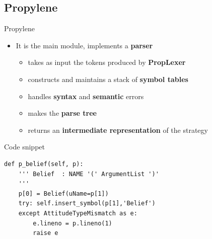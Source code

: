 \subsection{Propylene}
\begin{frame}[fragile]{Propylene}
  \begin{itemize}
  \item It is the main module, implements a {\bf parser}
    \begin{itemize}
    \item takes as input the tokens produced by {\bf PropLexer}
    \item constructs and maintains a stack of {\bf symbol tables}
    \item handles {\bf syntax} and {\bf semantic} errors
    \item makes the {\bf parse tree}
    \item returns an {\bf intermediate representation} of the strategy
    \end{itemize}
  \end{itemize}
  \begin{exampleblock}{Code snippet}
\begin{verbatim}
def p_belief(self, p):
    ''' Belief  : NAME '(' ArgumentList ')'
    '''
    p[0] = Belief(uName=p[1])
    try: self.insert_symbol(p[1],'Belief')
    except AttitudeTypeMismatch as e:
        e.lineno = p.lineno(1)
        raise e
\end{verbatim}
  \end{exampleblock}  
\end{frame}

